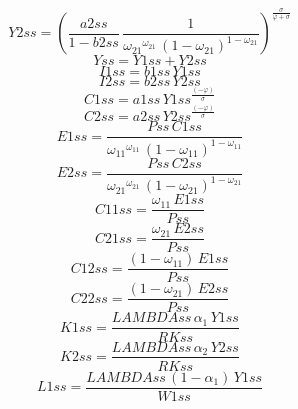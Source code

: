\begin{dmath*}
Y2ss = \left(\frac{{a2ss}}{1-{b2ss}}\, \frac{1}{{{\omega_{21}}}^{{{\omega_{21}}}}\, \left(1-{{\omega_{21}}}\right)^{1-{{\omega_{21}}}}}\right)^{\frac{{{\sigma}}}{{{\varphi}}+{{\sigma}}}}
\end{dmath*}
\begin{dmath*}
Yss = {Y1ss}+{Y2ss}
\end{dmath*}
\begin{dmath*}
I1ss = {b1ss}\, {Y1ss}
\end{dmath*}
\begin{dmath*}
I2ss = {b2ss}\, {Y2ss}
\end{dmath*}
\begin{dmath*}
C1ss = {a1ss}\, {Y1ss}^{\frac{\left(-{{\varphi}}\right)}{{{\sigma}}}}
\end{dmath*}
\begin{dmath*}
C2ss = {a2ss}\, {Y2ss}^{\frac{\left(-{{\varphi}}\right)}{{{\sigma}}}}
\end{dmath*}
\begin{dmath*}
E1ss = \frac{{Pss}\, {C1ss}}{{{\omega_{11}}}^{{{\omega_{11}}}}\, \left(1-{{\omega_{11}}}\right)^{1-{{\omega_{11}}}}}
\end{dmath*}
\begin{dmath*}
E2ss = \frac{{Pss}\, {C2ss}}{{{\omega_{21}}}^{{{\omega_{21}}}}\, \left(1-{{\omega_{21}}}\right)^{1-{{\omega_{21}}}}}
\end{dmath*}
\begin{dmath*}
C11ss = \frac{{{\omega_{11}}}\, {E1ss}}{{Pss}}
\end{dmath*}
\begin{dmath*}
C21ss = \frac{{{\omega_{21}}}\, {E2ss}}{{Pss}}
\end{dmath*}
\begin{dmath*}
C12ss = \frac{\left(1-{{\omega_{11}}}\right)\, {E1ss}}{{Pss}}
\end{dmath*}
\begin{dmath*}
C22ss = \frac{\left(1-{{\omega_{21}}}\right)\, {E2ss}}{{Pss}}
\end{dmath*}
\begin{dmath*}
K1ss = \frac{{LAMBDAss}\, {{\alpha_{1}}}\, {Y1ss}}{{RKss}}
\end{dmath*}
\begin{dmath*}
K2ss = \frac{{LAMBDAss}\, {{\alpha_{2}}}\, {Y2ss}}{{RKss}}
\end{dmath*}
\begin{dmath*}
L1ss = \frac{{LAMBDAss}\, \left(1-{{\alpha_{1}}}\right)\, {Y1ss}}{{W1ss}}
\end{dmath*}
